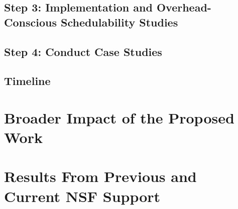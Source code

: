 \documentclass[10pt,letterpaper]{article}
\begin{document}
\subsection{Step 3: Implementation and Overhead-Conscious Schedulability Studies}
\label{sec:step3}



\subsection{Step 4: Conduct Case Studies}
\label{sec:step4}



\subsection{Timeline}
\label{sec:timeline}



\section{Broader Impact of the Proposed Work}
\label{sec:impact}




\section{Results From Previous and Current NSF Support}
\label{sec:prior} 


\newpage
{}

 



\newpage
{}
\thispagestyle{empty}
\end{document}
